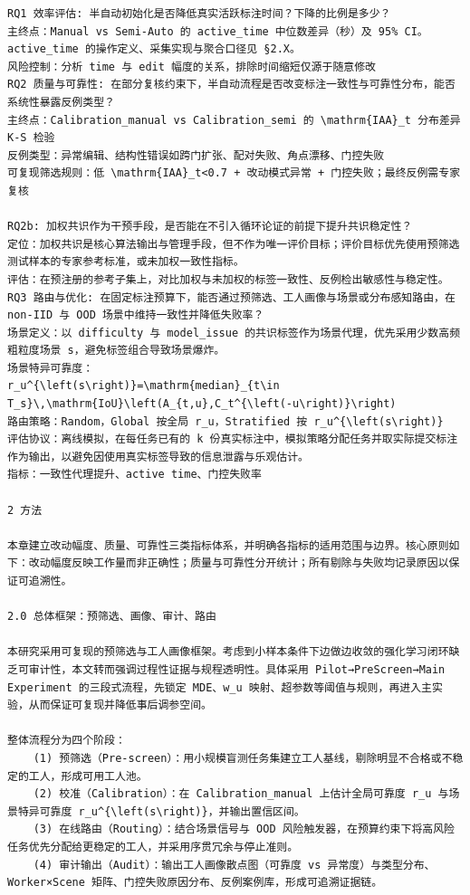\documentclass[a4paper,12pt]{article}
\begin{document}
\begin{Verbatim}[fontsize=\small,breaklines=true,breakanywhere=true]
RQ1 效率评估: 半自动初始化是否降低真实活跃标注时间？下降的比例是多少？
主终点：Manual vs Semi-Auto 的 active_time 中位数差异（秒）及 95% CI。active_time 的操作定义、采集实现与聚合口径见 §2.X。
风险控制：分析 time 与 edit 幅度的关系，排除时间缩短仅源于随意修改
RQ2 质量与可靠性: 在部分复核约束下，半自动流程是否改变标注一致性与可靠性分布，能否系统性暴露反例类型？
主终点：Calibration_manual vs Calibration_semi 的 \mathrm{IAA}_t 分布差异 K-S 检验
反例类型：异常编辑、结构性错误如跨门扩张、配对失败、角点漂移、门控失败
可复现筛选规则：低 \mathrm{IAA}_t<0.7 + 改动模式异常 + 门控失败；最终反例需专家复核

RQ2b: 加权共识作为干预手段，是否能在不引入循环论证的前提下提升共识稳定性？
定位：加权共识是核心算法输出与管理手段，但不作为唯一评价目标；评价目标优先使用预筛选测试样本的专家参考标准，或未加权一致性指标。
评估：在预注册的参考子集上，对比加权与未加权的标签一致性、反例检出敏感性与稳定性。
RQ3 路由与优化: 在固定标注预算下，能否通过预筛选、工人画像与场景或分布感知路由，在 non-IID 与 OOD 场景中维持一致性并降低失败率？
场景定义：以 difficulty 与 model_issue 的共识标签作为场景代理，优先采用少数高频粗粒度场景 s，避免标签组合导致场景爆炸。
场景特异可靠度：
r_u^{\left(s\right)}=\mathrm{median}_{t\in T_s}\,\mathrm{IoU}\left(A_{t,u},C_t^{\left(-u\right)}\right)
路由策略：Random，Global 按全局 r_u，Stratified 按 r_u^{\left(s\right)}
评估协议：离线模拟，在每任务已有的 k 份真实标注中，模拟策略分配任务并取实际提交标注作为输出，以避免因使用真实标签导致的信息泄露与乐观估计。
指标：一致性代理提升、active time、门控失败率

2 方法

本章建立改动幅度、质量、可靠性三类指标体系，并明确各指标的适用范围与边界。核心原则如下：改动幅度反映工作量而非正确性；质量与可靠性分开统计；所有剔除与失败均记录原因以保证可追溯性。

2.0 总体框架：预筛选、画像、审计、路由

本研究采用可复现的预筛选与工人画像框架。考虑到小样本条件下边做边收敛的强化学习闭环缺乏可审计性，本文转而强调过程性证据与规程透明性。具体采用 Pilot→PreScreen→Main Experiment 的三段式流程，先锁定 MDE、w_u 映射、超参数等阈值与规则，再进入主实验，从而保证可复现并降低事后调参空间。

整体流程分为四个阶段：
	(1) 预筛选（Pre-screen）：用小规模盲测任务集建立工人基线，剔除明显不合格或不稳定的工人，形成可用工人池。
	(2) 校准（Calibration）：在 Calibration_manual 上估计全局可靠度 r_u 与场景特异可靠度 r_u^{\left(s\right)}，并输出置信区间。
	(3) 在线路由（Routing）：结合场景信号与 OOD 风险触发器，在预算约束下将高风险任务优先分配给更稳定的工人，并采用序贯冗余与停止准则。
	(4) 审计输出（Audit）：输出工人画像散点图（可靠度 vs 异常度）与类型分布、Worker×Scene 矩阵、门控失败原因分布、反例案例库，形成可追溯证据链。


\end{Verbatim}
\end{document}
